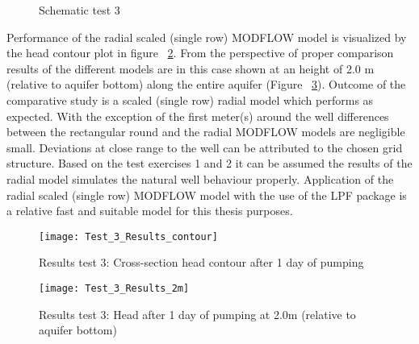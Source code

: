 \begin{figure}[h]
\centering
{}
\captionsetup{justification=centering}
\caption{Schematic test 3}
\label{fig:Schematictest3}
\end{figure}

Performance of the radial scaled (single row) MODFLOW model is visualized by the head contour plot in figure ~\ref{fig:Test3_results_contour}. From the perspective of proper comparison results of the different models are in this case shown at an height of 2.0 m (relative to aquifer bottom) along the entire aquifer (Figure ~\ref{fig:Test3.1_results}). Outcome of the comparative study is a scaled (single row) radial model which performs as expected. With the exception of the first meter(s) around the well differences between the rectangular round and the radial MODFLOW models are negligible small. Deviations at close range to the well can be attributed to the chosen grid structure. Based on the test exercises 1 and 2 it can be assumed the results of the radial model simulates the natural well behaviour properly. Application of the radial scaled (single row) MODFLOW model with the use of the LPF package is a relative fast and suitable model for this thesis purposes.  

\begin{figure}[h]
 \centering\texttt{[image: Test\_3\_Results\_contour]}
 \captionsetup{justification=centering}
 \caption{Results test 3: Cross-section head contour after 1 day of pumping}
 \label{fig:Test3_results_contour}
\end{figure} 

\begin{figure}[H]
 \centering\texttt{[image: Test\_3\_Results\_2m]}
 \captionsetup{justification=centering}
 \caption{Results test 3: Head after 1 day of pumping at 2.0m (relative to aquifer bottom)}
 \label{fig:Test3.1_results}
\end{figure} 
%

